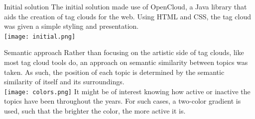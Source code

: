 \documentclass[a0paper, portrait]{baposter}
\begin{document}
\begin{poster}
  \begin{posterbox}[name=initial, column=0, below=tech]{Initial solution} {
    The initial solution made use of OpenCloud, a Java library that aids the creation of tag clouds for the web. Using HTML and CSS, the tag cloud was given a simple styling and presentation. \\
    
    \texttt{[image: initial.png]}
    \label{fig:2}
  }
  \end{posterbox}

  \begin{posterbox}[name=semantic, column=1, row=0]{Semantic approach} {
    Rather than focusing on the artistic side of tag clouds, like most tag cloud tools do, an approach on semantic similarity between topics was taken. As such, the position of each topic is determined by the semantic similarity of itself and its surroundings.\\[3ex]
    \texttt{[image: colors.png]}
    \label{fig:3}     
    It might be of interest knowing how active or inactive the topics have been throughout the years. For such cases, a two-color gradient is used, such that the brighter the color, the more active it is. 
  }
  \end{posterbox}
  

\end{poster}
\end{document}
